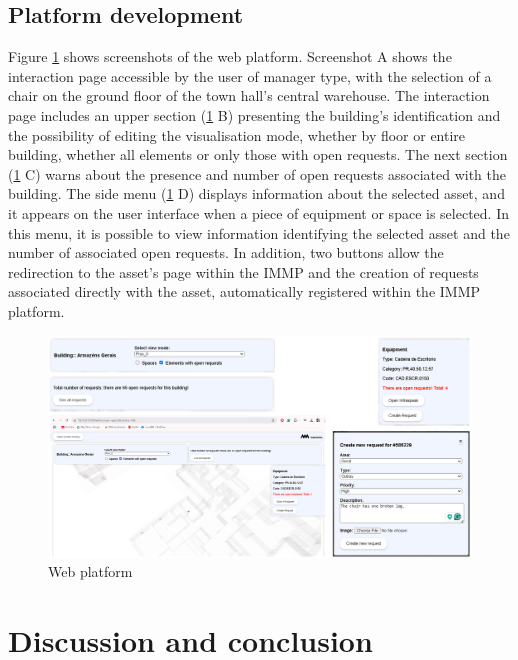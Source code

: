 \documentclass[a4paper, 10pt, twocolumn, twoside]{article}
\begin{document}
\subsection{Platform development}
\label{subsec:platform}

Figure \ref{fig_plataforma} shows screenshots of the web platform. Screenshot A shows the interaction page accessible by the user of manager type, with the selection of a chair on the ground floor of the town hall's central warehouse. The interaction page includes an upper section (\ref{fig_plataforma} B) presenting the building's identification and the possibility of editing the visualisation mode, whether by floor or entire building, whether all elements or only those with open requests. The next section (\ref{fig_plataforma} C) warns about the presence and number of open requests associated with the building. The side menu (\ref{fig_plataforma} D) displays information about the selected asset, and it appears on the user interface when a piece of equipment or space is selected. In this menu, it is possible to view information identifying the selected asset and the number of associated open requests. In addition, two buttons allow the redirection to the asset's page within the IMMP and the creation of requests associated directly with the asset, automatically registered within the IMMP platform.

\begin{figure}[!htb]
    \centering
    \includegraphics[width=\textwidth]{Images/plataforma_parcial.png}
    \caption{Web platform}
    \label{fig_plataforma}
\end{figure}

\section{Discussion and conclusion}
\label{sec:conclusion}
\end{document}

